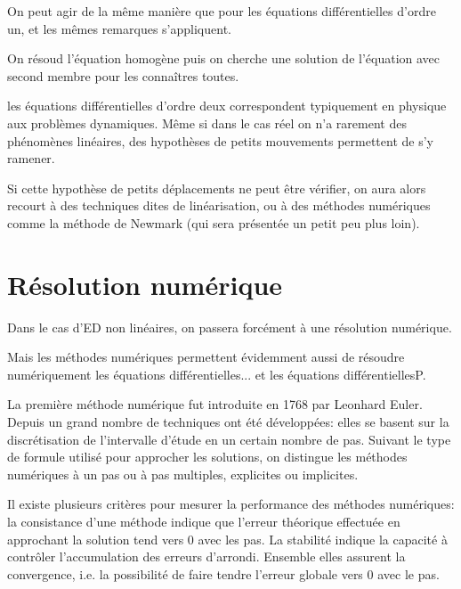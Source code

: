 On peut agir de la même manière que pour les équations différentielles d'ordre un, et les mêmes
remarques s'appliquent.

On résoud l'équation homogène puis on cherche une solution de l'équation avec second membre 
pour les connaîtres toutes.

\medskip
les équations différentielles d'ordre deux correspondent typiquement en physique aux problèmes dynamiques.
Même si dans le cas réel on n'a rarement des phénomènes linéaires, des hypothèses
de petits mouvements permettent de s'y ramener.

Si cette hypothèse de petits déplacements ne peut être vérifier, on aura
alors recourt à des techniques dites de linéarisation, ou à des méthodes
numériques comme la méthode de Newmark (qui sera présentée un petit peu
plus loin).










\bigskip
\newpage%
\section{Résolution numérique}

Dans le cas d'ED non linéaires, on passera forcément à une résolution numérique.

Mais les méthodes numériques permettent évidemment aussi de résoudre
numériquement les équations différentielles... et les équations différentiellesP.

\bigskip
\begin{histoire}%
La première méthode numérique fut introduite en 1768 par Leonhard Euler. 
Depuis un grand nombre de techniques ont été développées: 
elles se basent sur la discrétisation de l'intervalle d'étude en un certain nombre de pas. 
Suivant le type de formule utilisé pour approcher les solutions, on distingue les méthodes 
numériques à un pas ou à pas multiples, explicites ou implicites.

\medskip
Il existe plusieurs critères pour mesurer la performance des méthodes numériques: 
la consistance d'une méthode indique que l'erreur théorique effectuée en approchant 
la solution tend vers 0 avec les pas. 
La stabilité indique la capacité à contrôler l'accumulation des erreurs d'arrondi. 
Ensemble elles assurent la convergence, i.e. la possibilité de faire tendre l'erreur globale 
vers 0 avec le pas.
\end{histoire}

